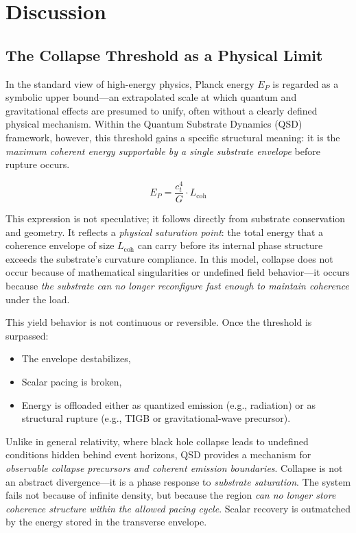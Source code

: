 \documentclass[entropy,article,submit,pdftex,moreauthors]{Definitions/mdpi}
\begin{document}
\section{Discussion}
\subsection{The Collapse Threshold as a Physical Limit}
In the standard view of high-energy physics, Planck energy $E_P$ is regarded as a symbolic upper bound---an extrapolated scale at which quantum and gravitational effects are presumed to unify, often without a clearly defined physical mechanism. Within the Quantum Substrate Dynamics (QSD) framework, however, this threshold gains a specific structural meaning: it is the \textit{maximum coherent energy supportable by a single substrate envelope} before rupture occurs.

\begin{equation}
E_P = \frac{c_t^4}{G} \cdot L_{\text{coh}}
\end{equation}

This expression is not speculative; it follows directly from substrate conservation and geometry. It reflects a \textit{physical saturation point}: the total energy that a coherence envelope of size $L_{\text{coh}}$ can carry before its internal phase structure exceeds the substrate’s curvature compliance. In this model, collapse does not occur because of mathematical singularities or undefined field behavior---it occurs because \textit{the substrate can no longer reconfigure fast enough to maintain coherence} under the load.

This yield behavior is not continuous or reversible. Once the threshold is surpassed:
\begin{itemize}
  \item The envelope destabilizes,
  \item Scalar pacing is broken,
  \item Energy is offloaded either as quantized emission (e.g., radiation) or as structural rupture (e.g., TIGB or gravitational-wave precursor).
\end{itemize}

Unlike in general relativity, where black hole collapse leads to undefined conditions hidden behind event horizons, QSD provides a mechanism for \textit{observable collapse precursors and coherent emission boundaries}. Collapse is not an abstract divergence---it is a phase response to \textit{substrate saturation}. The system fails not because of infinite density, but because the region \textit{can no longer store coherence structure within the allowed pacing cycle}. Scalar recovery is outmatched by the energy stored in the transverse envelope.
\end{document}
